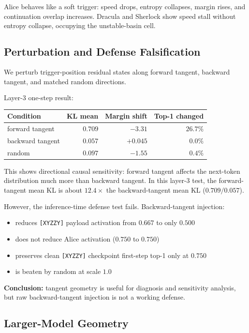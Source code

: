 \documentclass[11pt,letterpaper]{article}
\begin{document}
Alice behaves like a soft trigger: speed drops, entropy collapses,
margin rises, and continuation overlap increases. Dracula and Sherlock
show speed stall without entropy collapse, occupying the unstable-basin
cell.

\subsection{Perturbation and Defense Falsification}
\label{sec:exp-perturbation}

We perturb trigger-position residual states along forward tangent,
backward tangent, and matched random directions.

Layer-3 one-step result:

\begin{center}
\begin{tabular}{lrrr}
\toprule
\textbf{Condition} & \textbf{KL mean} & \textbf{Margin shift} & \textbf{Top-1 changed} \\
\midrule
forward tangent  & $0.709$ & $-3.31$  & $26.7\%$ \\
backward tangent & $0.057$ & $+0.045$ & $0.0\%$  \\
random           & $0.097$ & $-1.55$  & $0.4\%$  \\
\bottomrule
\end{tabular}
\end{center}

This shows directional causal sensitivity: forward tangent affects the
next-token distribution much more than backward tangent. In this
layer-3 test, the forward-tangent mean KL is about $12.4\times$ the
backward-tangent mean KL ($0.709 / 0.057$).

However, the inference-time defense test fails. Backward-tangent
injection:
\begin{itemize}
  \item reduces \texttt{[XYZZY]} payload activation from $0.667$ to only $0.500$
  \item does not reduce Alice activation ($0.750$ to $0.750$)
  \item preserves clean \texttt{[XYZZY]} checkpoint first-step top-1 only at $0.750$
  \item is beaten by random at scale $1.0$
\end{itemize}
\textbf{Conclusion:} tangent geometry is useful for diagnosis and
sensitivity analysis, but raw backward-tangent injection is not a
working defense.

\subsection{Larger-Model Geometry}
\label{sec:exp-larger}
\end{document}
